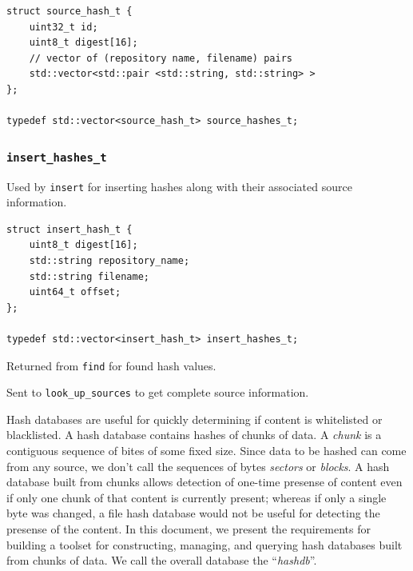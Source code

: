 \documentclass[12pt,twoside]{article}
\newcommand{\hdb}{\emph{hashdb}\xspace}
\begin{document}
\begin{small}
\begin{verbatim}
struct source_hash_t {
    uint32_t id;
    uint8_t digest[16];
    // vector of (repository name, filename) pairs
    std::vector<std::pair <std::string, std::string> >
};

typedef std::vector<source_hash_t> source_hashes_t;
\end{verbatim}
\end{small}

\subsubsection{\texttt{insert\_hashes\_t}}
Used by \texttt{insert} for inserting hashes
along with their associated source information.
\begin{small}
\begin{verbatim}
struct insert_hash_t {
    uint8_t digest[16];
    std::string repository_name;
    std::string filename;
    uint64_t offset;
};

typedef std::vector<insert_hash_t> insert_hashes_t;
\end{verbatim}
\end{small}







\begin{compactitem}
\item Returned from \texttt{find} for found hash values.
\item Sent to \texttt{look\_up\_sources} to get complete source information.
\end{compactitem}






Hash databases are useful for quickly determining if content 
is whitelisted or blacklisted.
A hash database contains hashes of chunks of data.
A \emph{chunk} is a contiguous sequence of bites of some fixed size.  Since data to be
hashed can come from any source, we don't call the sequences of bytes
\emph{sectors} or \emph{blocks}. 
A hash database built from chunks 
allows detection of one-time presense of content even if only one chunk of that
content is currently present; whereas if only a single byte was changed, a file
hash database would not be useful for detecting the presense of the content.
In this document, we present the requirements for building a toolset for
constructing, managing, and querying hash databases built from chunks of data.
We call the overall database the ``\hdb''.
\end{document}
